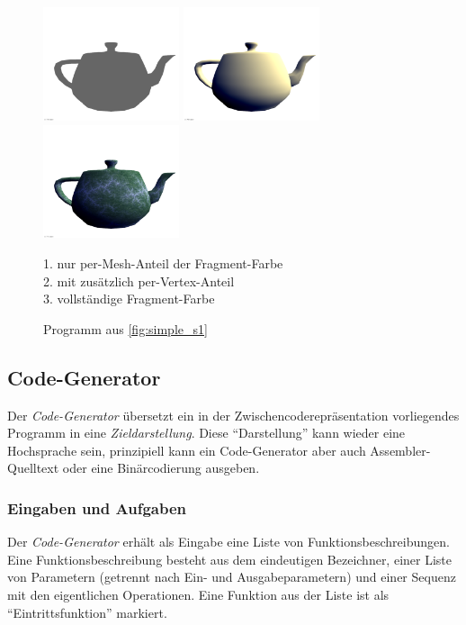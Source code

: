 \documentclass[twoside,a4paper,fleqn,12pt]{article}
\begin{document}
\begin{figure}[h]
  \centering
  \includegraphics[width=4cm]{simple_s1_mesh}\quad
  \includegraphics[width=4cm]{simple_s1_vert}\quad
  \includegraphics[width=4cm]{simple_s1_frag}
  \caption{Programm aus \ref{fig:simple_s1}}
  \small 1. nur per-Mesh-Anteil der Fragment-Farbe\\
  2. mit zusätzlich per-Vertex-Anteil\\
  3. vollständige Fragment-Farbe\\
  \label{fig:simple_s1_images}
\end{figure}

\newpage
\subsection{Code-Generator}

Der \emph{Code-Generator} übersetzt ein in der Zwischencoderepräsentation vorliegendes Programm in eine \emph{Zieldarstellung}.
Diese "`Darstellung"' kann wieder eine Hochsprache sein, prinzipiell kann ein Code-Generator aber auch Assembler-Quelltext oder eine
Binärcodierung ausgeben.

\subsubsection{Eingaben und Aufgaben}

Der \emph{Code-Generator} erhält als Eingabe eine Liste von Funktionsbeschreibungen.
Eine Funktionsbeschreibung besteht aus dem eindeutigen Bezeichner, einer Liste von Parametern (getrennt nach Ein- und Ausgabeparametern)
und einer Sequenz mit den eigentlichen Operationen. Eine Funktion aus der Liste ist als "`Eintrittsfunktion"' markiert.
\end{document}

